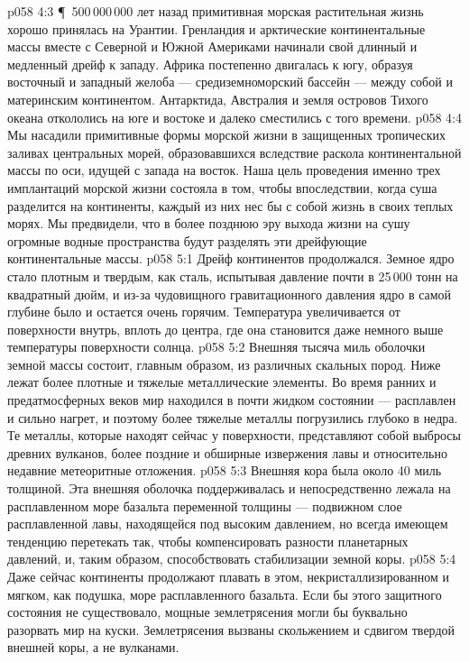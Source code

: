 \vs p058 4:3 \P\ 500\,000\,000 лет назад примитивная морская растительная жизнь хорошо принялась на Урантии. Гренландия и арктические континентальные массы вместе с Северной и Южной Америками начинали свой длинный и медленный дрейф к западу. Африка постепенно двигалась к югу, образуя восточный и западный желоба --- средиземноморский бассейн --- между собой и материнским континентом. Антарктида, Австралия и земля островов Тихого океана откололись на юге и востоке и далеко сместились с того времени.
\vs p058 4:4 Мы насадили примитивные формы морской жизни в защищенных тропических заливах центральных морей, образовавшихся вследствие раскола континентальной массы по оси, идущей с запада на восток. Наша цель проведения именно трех имплантаций морской жизни состояла в том, чтобы впоследствии, когда суша разделится на континенты, каждый из них нес бы с собой жизнь в своих теплых морях. Мы предвидели, что в более позднюю эру выхода жизни на сушу огромные водные пространства будут разделять эти дрейфующие континентальные массы.
\vs p058 5:1 Дрейф континентов продолжался. Земное ядро стало плотным и твердым, как сталь, испытывая давление почти в 25\,000 тонн на квадратный дюйм, и из\hyp{}за чудовищного гравитационного давления ядро в самой глубине было и остается очень горячим. Температура увеличивается от поверхности внутрь, вплоть до центра, где она становится даже немного выше температуры поверхности солнца.
\vs p058 5:2 Внешняя тысяча миль оболочки земной массы состоит, главным образом, из различных скальных пород. Ниже лежат более плотные и тяжелые металлические элементы. Во время ранних и предатмосферных веков мир находился в почти жидком состоянии --- расплавлен и сильно нагрет, и поэтому более тяжелые металлы погрузились глубоко в недра. Те металлы, которые находят сейчас у поверхности, представляют собой выбросы древних вулканов, более поздние и обширные извержения лавы и относительно недавние метеоритные отложения.
\vs p058 5:3 Внешняя кора была около 40 миль толщиной. Эта внешняя оболочка поддерживалась и непосредственно лежала на расплавленном море базальта переменной толщины --- подвижном слое расплавленной лавы, находящейся под высоким давлением, но всегда имеющем тенденцию перетекать так, чтобы компенсировать разности планетарных давлений, и, таким образом, способствовать стабилизации земной коры.
\vs p058 5:4 Даже сейчас континенты продолжают плавать в этом, некристаллизированном и мягком, как подушка, море расплавленного базальта. Если бы этого защитного состояния не существовало, мощные землетрясения могли бы буквально разорвать мир на куски. Землетрясения вызваны скольжением и сдвигом твердой внешней коры, а не вулканами.
